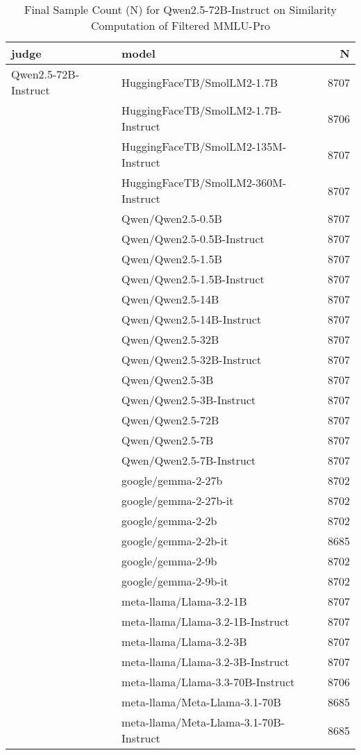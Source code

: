 \begin{table}[]
    \centering
     \caption{Final Sample Count (N) for Qwen2.5-72B-Instruct on Similarity Computation of Filtered MMLU-Pro}
\begin{tabular}{llr}
\toprule
judge & model & N \\
\midrule
Qwen2.5-72B-Instruct & HuggingFaceTB/SmolLM2-1.7B & 8707 \\
 & HuggingFaceTB/SmolLM2-1.7B-Instruct & 8706 \\
 & HuggingFaceTB/SmolLM2-135M-Instruct & 8707 \\
 & HuggingFaceTB/SmolLM2-360M-Instruct & 8707 \\
 & Qwen/Qwen2.5-0.5B & 8707 \\
 & Qwen/Qwen2.5-0.5B-Instruct & 8707 \\
 & Qwen/Qwen2.5-1.5B & 8707 \\
 & Qwen/Qwen2.5-1.5B-Instruct & 8707 \\
 & Qwen/Qwen2.5-14B & 8707 \\
 & Qwen/Qwen2.5-14B-Instruct & 8707 \\
 & Qwen/Qwen2.5-32B & 8707 \\
 & Qwen/Qwen2.5-32B-Instruct & 8707 \\
 & Qwen/Qwen2.5-3B & 8707 \\
 & Qwen/Qwen2.5-3B-Instruct & 8707 \\
 & Qwen/Qwen2.5-72B & 8707 \\
 & Qwen/Qwen2.5-7B & 8707 \\
 & Qwen/Qwen2.5-7B-Instruct & 8707 \\
 & google/gemma-2-27b & 8702 \\
 & google/gemma-2-27b-it & 8702 \\
 & google/gemma-2-2b & 8702 \\
 & google/gemma-2-2b-it & 8685 \\
 & google/gemma-2-9b & 8702 \\
 & google/gemma-2-9b-it & 8702 \\
 & meta-llama/Llama-3.2-1B & 8707 \\
 & meta-llama/Llama-3.2-1B-Instruct & 8707 \\
 & meta-llama/Llama-3.2-3B & 8707 \\
 & meta-llama/Llama-3.2-3B-Instruct & 8707 \\
 & meta-llama/Llama-3.3-70B-Instruct & 8706 \\
 & meta-llama/Meta-Llama-3.1-70B & 8685 \\
 & meta-llama/Meta-Llama-3.1-70B-Instruct & 8685 \\

\end{tabular}
\end{table}
